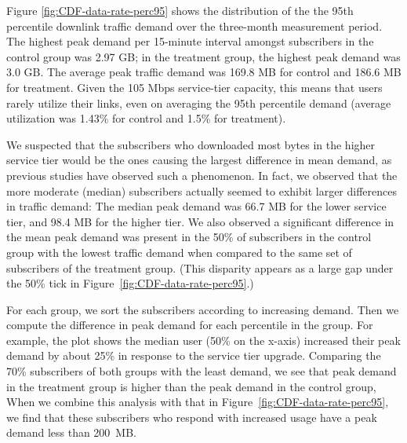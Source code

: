 Figure \ref{fig:CDF-data-rate-perc95} shows the distribution of the the
95th percentile downlink traffic demand over the three-month measurement
period. The highest peak demand per 15-minute interval amongst
subscribers in the control group was 2.97 GB; in the treatment group,
the highest peak demand was 3.0 GB.
The average peak traffic demand was 169.8 MB for control and
186.6 MB for treatment. Given the 105 Mbps service-tier capacity,
this means that users rarely utilize their links,
even on averaging the 95th percentile demand (average utilization was 
1.43\% for control and 1.5\% for treatment).

We suspected that the subscribers who downloaded most bytes in the
higher service tier would be the ones causing the largest difference in
mean demand, as previous studies have observed such a phenomenon. In
fact, we observed that the more moderate (median) subscribers actually seemed
to exhibit larger differences in traffic demand: The median peak demand
was 66.7 MB for the lower service tier, and 98.4 MB for the higher
tier.  
We also observed a significant difference in the mean peak
demand was present in the 50\% of subscribers in the control group
with the lowest traffic demand when compared to the same set of
subscribers of the treatment group. (This disparity appears as a large
gap under the 50\% tick in Figure~\ref{fig:CDF-data-rate-perc95}.)


For each group, we sort the subscribers according to
increasing demand.  Then we compute the difference in peak demand for
each percentile in the group.  For example, the plot shows the median
user (50\% on the x-axis) increased their peak demand by about 25\% in
response to the service tier upgrade.  Comparing the 70\% subscribers of
both groups with the least demand, we see that peak demand in the
treatment group is higher than the peak demand in the control group,
 When we combine this analysis with that in
Figure~\ref{fig:CDF-data-rate-perc95}, we find that these subscribers
who respond with increased usage have a peak demand less than 200~MB.



